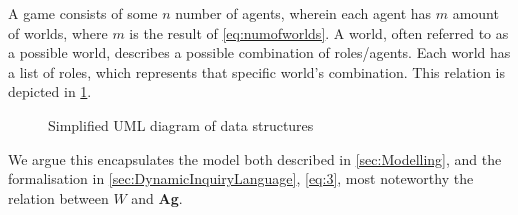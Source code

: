 A game consists of some $n$ number of agents, wherein each agent has $m$ amount
of worlds, where $m$ is the result of \cref{eq:numofworlds}. A world, often
referred to as a possible world, describes a possible combination of
roles/agents. Each world has a list of roles, which represents that specific
world's combination. This relation is depicted in \cref{fig:DataStructuresUML}.
\begin{comment}
To provide some context for the upcoming sections, this part will describe the
data structures they are based upon. \\ \\ A world, often
referred to as a possible world, describes a possible combination of roles/agents.
Most information is unknown to an agent in its environment,
therefore if a role of another agent is unknown they could be all roles. So for
each agent, they store their own list of all possible worlds, with every single
combination of agents and roles. Each world object itself stores whether it is active,
and number of marks. Marks and is active\footnote{Is active refers to active and inactive
	worlds} both being previously described in \cref{sec:Modelling}.\\ The
player object stores information about the agent, such as name, role, and alive
status. Besides storing information it acts as a gateway to functions that
include the agent. Such as communication, instead of calling a function and
including the agent, the communication is called directly from the agent object. \\
The overall data structure is the game object, that encapsulates all
information and objects into a single object.
\end{comment}
\renewcommand{\umlfillcolor}{white}
\renewcommand{\umldrawcolor}{blue}
\begin{figure}[H]
	\centering
	\vspace*{3mm}
	\caption{Simplified UML diagram of data structures}
	\label{fig:DataStructuresUML}
\end{figure}
We argue this encapsulates the model both described in \cref{sec:Modelling}, and the formalisation in
\cref{sec:DynamicInquiryLanguage}, \cref{eq:3}, most noteworthy the relation between $W$ and \textbf{Ag}.
